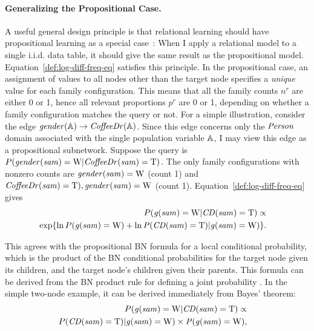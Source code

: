 \documentclass{sfuthesis}
\newcommand{\iid}{i.i.d.}
\begin{document}
\paragraph{Generalizing the Propositional Case.} A useful general design principle is that relational learning should have propositional learning as a special case~\cite{Ch.10deraedt,Knobbe2006}: When I  apply a relational model to a single \iid{} data table, it should give the same result as the propositional model. Equation~\ref{def:log-diff-freq-eq} satisfies this principle. In the propositional case, an assignment of values to all nodes other than the target node specifies a {\em unique} value for each family configuration. This means that all the family counts $n^{r}$ are either 0 or 1, hence all relevant proportions $p^{r}$ are 0 or 1, depending on whether a family configuration matches the query or not. For a simple illustration, consider the edge $\it{gender}(\mathbb{A}) \rightarrow \it{CoffeeDr}(\mathbb{A})$. Since this edge concerns only the $\it{Person}$ domain associated with the single population variable $\mathbb{A}$, I  may 
view this edge as a propositional subnetwork.
%
Suppose the query is $P(\it{gender}(sam)= \mathrm{W}|\it{CoffeeDr}(sam)=\mathrm{T})$. The only family configurations with nonzero counts are $\it{gender}(sam)= \mathrm{W}$ (count 1) and $\it{CoffeeDr}(sam)=\mathrm{T}),\it{gender}(sam)= \mathrm{W}$ (count 1). Equation~\eqref{def:log-diff-freq-eq} gives
\begin{eqnarray*}
P(\it{g}(sam)= \mathrm{W}|\it{CD}(sam)=\mathrm{T}) \propto \\
\exp \{\ln P(\it{g}(sam)= \mathrm{W}) + \ln P(\it{CD}(sam)=\mathrm{T})|\it{g}(sam)= \mathrm{W})\}.&&
\end{eqnarray*}


This agrees with the propositional BN formula for a local conditional probability, which is the product of the BN conditional probabilities for the target node given its children, and the target node's children given their parents. This formula can be derived from the BN product rule for defining a joint probability \cite[Ch.14.5.2]{Russell2010}. In the simple two-node example, it can be derived immediately from Bayes' theorem:
\begin{eqnarray*}
P(\it{g}(sam)= \mathrm{W}|\it{CD}(sam)=\mathrm{T}) \propto \\
P(\it{CD}(sam)=\mathrm{T})|\it{g}(sam)= \mathrm{W}) \times P(\it{g}(sam)= \mathrm{W}),&&
\end{eqnarray*}
\end{document}
